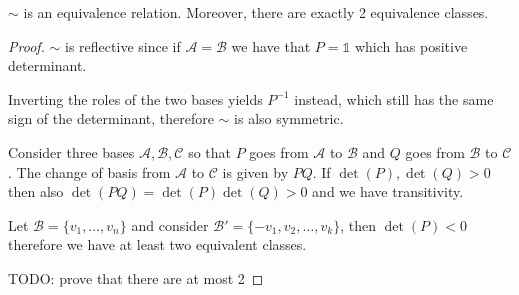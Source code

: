 \documentclass[12pt]{extarticle}
\begin{document}
\begin{proposition}{}{}
	$\sim$ is an equivalence relation. Moreover, there are exactly 2 equivalence classes.
\end{proposition}

\begin{proof}
	$\sim$ is reflective since if $\mathcal A = \mathcal B$ we have that $P = \mathds 1$ which has
	positive determinant.

	Inverting the roles of the two bases yields $P^{-1}$ instead, which still has the same sign of the
	determinant, therefore $\sim$ is also symmetric.

	Consider three bases $\mathcal A, \mathcal B, \mathcal C$ so that $P$ goes from $\mathcal A$ to
	$\mathcal B$ and $Q$ goes from $\mathcal B$ to $\mathcal C$. The change of basis from $\mathcal A$
	to $\mathcal C$ is given by $PQ$.
	If $\det (P), \det (Q) > 0$ then also $\det(PQ) = \det(P) \det(Q) > 0$ and we have transitivity.

	Let $\mathcal B = \{ v_1, \dots, v_n\}$ and consider $\mathcal B' = \{-v_1, v_2, \dots, v_k\}$,
	then $\det(P) < 0$ therefore we have at least two equivalent classes.

	TODO: prove that there are at most 2
\end{proof}
\end{document}
